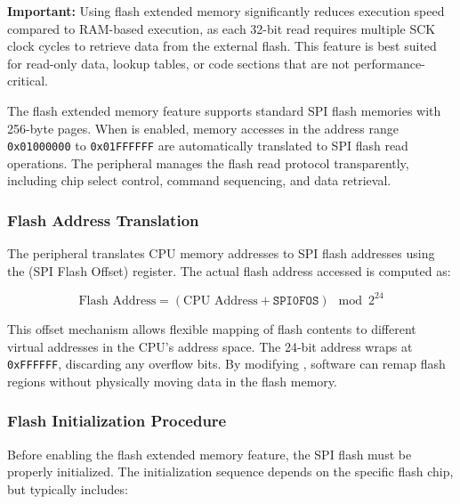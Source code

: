 \textbf{Important:} Using flash extended memory significantly reduces execution speed compared to RAM-based execution, as each 32-bit read requires multiple SCK clock cycles to retrieve data from the external flash. This feature is best suited for read-only data, lookup tables, or code sections that are not performance-critical.

The flash extended memory feature supports standard SPI flash memories with 256-byte pages. When  is enabled, memory accesses in the address range \texttt{0x01000000} to \texttt{0x01FFFFFF} are automatically translated to SPI flash read operations. The  peripheral manages the flash read protocol transparently, including chip select control, command sequencing, and data retrieval.

\subsubsection{Flash Address Translation}

The  peripheral translates CPU memory addresses to SPI flash addresses using the  (SPI Flash Offset) register. The actual flash address accessed is computed as:

\begin{equation*}
\text{Flash Address} = (\text{CPU Address} + \texttt{SPI0FOS}) \mod 2^{24}
\end{equation*}

This offset mechanism allows flexible mapping of flash contents to different virtual addresses in the CPU's address space. The 24-bit address wraps at \texttt{0xFFFFFF}, discarding any overflow bits. By modifying , software can remap flash regions without physically moving data in the flash memory.

\subsubsection{Flash Initialization Procedure}

Before enabling the flash extended memory feature, the SPI flash must be properly initialized. The initialization sequence depends on the specific flash chip, but typically includes:

